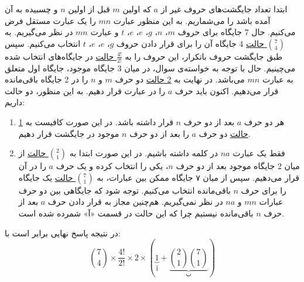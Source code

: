 \p
ابتدا تعداد جایگشت‌های  حروف غیر از 
$a$ که اولین $m$
 قبل از اولین $n$ 
 و چسبیده به آن آمده ‌باشد را می‌شماریم.
به این منظور عبارت $mn$ را یک عبارت مستقل فرض می‌کنیم.
حال 7 جایگاه برای حروف
$m$، 
$n$،
$g$، 
$e$، 
$e$، 
$t$
و عبارت
 $mn$ 
در نظر می‌گیریم. 
به 
\underline{${7\choose 4}$ حالت}
 4 جایگاه آن را برای قرار دادن حروف 
$g$،
$e$، 
$e$، 
$t$
انتخاب می‌کنیم.
 سپس طبق جایگشت حروف باتکرار، این حروف را به
 \underline{$\frac{4!}{2!}$ حالت}
در جایگاه‌های انتخاب شده می‌چینیم.
حال با توجه به خواسته‌ی سوال، در میان 3 جایگاه موجود،  
جایگاه اول متعلق به عبارت
 $mn$ می‌باشد.
  در نهایت به
 \underline{2 حالت}
 دو حرف
 $m$ و $n$
را در 2 جایگاه باقی‌مانده 
 قرار می‌دهیم.
اکنون باید حرف $a$ را در عبارت قرار دهیم.
به این منظور، دو حالت داریم:
\begin{enumerate}
  \item 
  
  هر دو حرف 
  $a$ بعد از دو حرف
  $n$ قرار داشته باشد. در این صورت کافیست به
  \underline{1 حالت}
  دو حرف 
  $a$ را بعد از دو حرف
  $n$ 
  موجود در جایگشت قرار دهیم.
  \item
  
  فقط یک عبارت 
  $na$
  در کلمه داشته‌ باشیم. در این صورت ابتدا به
  \underline{${2\choose 1}$ حالت}
  از میان 2 جایگاه موجود بعد از دو حرف
  $n$،  
  یکی را انتخاب کرده و یک حرف
  $a$
   را در آن قرار می‌دهیم. 
    سپس از میان ۷ جایگاه ممکن بین عبارات،
   به
   \underline{${7\choose 1}$ حالت}
   یک جایگاه را برای حرف 
   $n$ باقی‌مانده انتخاب می‌کنیم.
   توجه شود که جایگاهی بین دو حرف عبارات 
   $mn$ و $na$ 
   در نظر نمی‌گیریم.
   هم‌چنین مجاز به قرار دادن حرف 
   $a$ بعد از حرف $n$
    باقی‌مانده نیستیم چرا که این حالت در قسمت «آ» شمرده شده است.
\end{enumerate}
\p
در نتیجه پاسخ نهایی برابر است با:
$${7\choose 4} \times \frac{4!}{2!} \times 2 \times (\underbrace{1}_{\text{آ}} + \underbrace{{2\choose 1}{7\choose 1}}_{\text{ب}})$$
